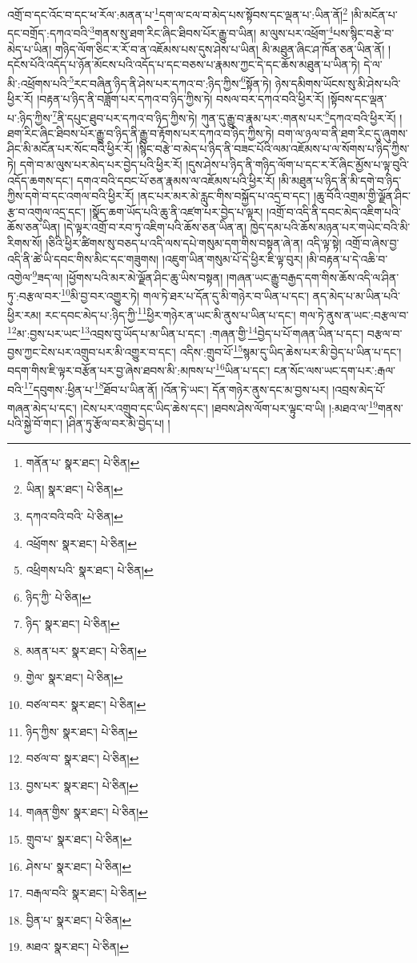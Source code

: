 འགྲོ་བ་དང་འོང་བ་དང་ཕ་རོལ་:མནན་པ་\footnote{གནོན་པ་  སྣར་ཐང་།  པེ་ཅིན། }དག་ལ་ངལ་བ་མེད་པས་སྟོབས་དང་ལྡན་པ་:ཡིན་ནོ།\footnote{ཡིན།  སྣར་ཐང་།  པེ་ཅིན། } །མི་མངོན་པ་དང་བགྲོད་:དཀའ་བའི་\footnote{དཀའ་བའི་བའི་  པེ་ཅིན། }གནས་སུ་ཐག་རིང་ཞིང་ཐིབས་པོར་རྒྱུ་བ་ཡིན། མ་ལུས་པར་འཕྲོག་\footnote{འཕྲོགས་  སྣར་ཐང་།  པེ་ཅིན། }པས་སྙིང་བརྩེ་བ་མེད་པ་ཡིན། གཉིད་ལོག་ཅིང་ར་རོ་བ་ན་འཇོམས་པས་དུས་ཤེས་པ་ཡིན། མི་མཐུན་ཞིང་ཤ་ཁོན་ཅན་ཡིན་ནོ། །དངོས་པོའི་འདོད་པ་ཉོན་མོངས་པའི་འདོད་པ་དང་བཅས་པ་རྣམས་ཀྱང་དེ་དང་ཆོས་མཐུན་པ་ཡིན་ཏེ། དེ་ལ་མི་:འཕྲོགས་པའི་\footnote{འཕྲིགས་པའི་  སྣར་ཐང་།  པེ་ཅིན། }རང་བཞིན་ཉིད་ནི་ཤེས་པར་དཀའ་བ་:ཉིད་ཀྱིས་\footnote{ཉིད་ཀྱི་  པེ་ཅིན། }སྟོན་ཏེ། ཉེས་དམིགས་ཡོངས་སུ་མི་ཤེས་པའི་ཕྱིར་རོ། །བརྟན་པ་ཉིད་ནི་བཟློག་པར་དཀའ་བ་ཉིད་ཀྱིས་ཏེ། བསལ་བར་དཀའ་བའི་ཕྱིར་རོ། །སྟོབས་དང་ལྡན་པ་:ཉིད་ཀྱིས་\footnote{ཉིད་  སྣར་ཐང་།  པེ་ཅིན། }ནི་དཔུང་ཐུབ་པར་དཀའ་བ་ཉིད་ཀྱིས་ཏེ། ཀུན་དུ་རྒྱུ་བ་རྣམ་པར་:གནས་པར་\footnote{མནན་པར་  སྣར་ཐང་།  པེ་ཅིན། }དཀའ་བའི་ཕྱིར་རོ། །ཐག་རིང་ཞིང་ཐིབས་པོར་རྒྱུ་བ་ཉིད་ནི་རྒྱུ་བ་རྟོགས་པར་དཀའ་བ་ཉིད་ཀྱིས་ཏེ། བག་ལ་ཉལ་བ་ནི་ཐག་རིང་དུ་ཞུགས་ཤིང་མི་མངོན་པར་སོང་བའི་ཕྱིར་རོ། །སྙིང་བརྩེ་བ་མེད་པ་ཉིད་ནི་བཟང་པོའི་ལམ་འཇོམས་པ་ལ་སོགས་པ་ཉིད་ཀྱིས་ཏེ། དགེ་བ་མ་ལུས་པར་མེད་པར་བྱེད་པའི་ཕྱིར་རོ། །དུས་ཤེས་པ་ཉིད་ནི་གཉིད་ལོག་པ་དང་ར་རོ་ཞིང་མྱོས་པ་ལྟ་བུའི་འདོད་ཆགས་དང་། དགའ་བའི་དབང་པོ་ཅན་རྣམས་ལ་འཇོམས་པའི་ཕྱིར་རོ། །མི་མཐུན་པ་ཉིད་ནི་མི་དགེ་བ་ཉིད་ཀྱིས་དགེ་བ་དང་འགལ་བའི་ཕྱིར་རོ། །ནང་པར་མར་མེ་རླུང་གིས་བསྐྱོད་པ་འདྲ་བ་དང་། །ཆུ་བོའི་འགྲམ་གྱི་ལྗོན་ཤིང་རྩ་བ་འགུལ་འདྲ་དང་། །སྣོད་ཆག་ཡོད་པའི་ཆུ་ནི་འཛག་པར་བྱེད་པ་ལྟར། །འགྲོ་བ་འདི་ནི་དབང་མེད་འཇིག་པའི་ཆོས་ཅན་ཡིན། །དེ་ལྟར་འགྲོ་བ་རབ་ཏུ་འཇིག་པའི་ཆོས་ཅན་ཡིན་ན། ཁྱེད་དམ་པའི་ཆོས་མཉན་པར་གཡེང་བའི་མི་རིགས་སོ། །ཅིའི་ཕྱིར་ཚིགས་སུ་བཅད་པ་འདི་ལས་དཔེ་གསུམ་དག་གིས་བསྟན་ཞེ་ན། འདི་ལྟ་སྟེ། འགྲོ་བ་ཞེས་བྱ་འདི་ནི་ཚེ་ཡི་དབང་གིས་མིང་དང་གཟུགས། །འཇུག་ཡིན་གསུམ་པོ་དེ་ཕྱིར་ཇི་ལྟ་བུར། །མི་བརྟན་པ་དེ་འཆི་བ་འགྱེལ་\footnote{གྱེལ་  སྣར་ཐང་།  པེ་ཅིན། }ཟད་ལ། །ཕྱོགས་པའི་མར་མེ་ལྗོན་ཤིང་ཆུ་ཡིས་བསྟན། །གཞན་ཡང་རྒྱུ་བརྒྱད་དག་གིས་ཆོས་འདི་ལ་ཤིན་ཏུ་:བརྩལ་བར་\footnote{བཙལ་བར་  སྣར་ཐང་།  པེ་ཅིན། }མི་བྱ་བར་འགྱུར་ཏེ། གལ་ཏེ་ཐར་པ་དོན་དུ་མི་གཉེར་བ་ཡིན་པ་དང་། ནད་མེད་པ་མ་ཡིན་པའི་ཕྱིར་རམ། རང་དབང་མེད་པ་:ཉིད་ཀྱི་\footnote{ཉིད་ཀྱིས་  སྣར་ཐང་།  པེ་ཅིན། }ཕྱིར་གཉེར་ན་ཡང་མི་ནུས་པ་ཡིན་པ་དང་། གལ་ཏེ་ནུས་ན་ཡང་:བརྩལ་བ་\footnote{བཙལ་བ་  སྣར་ཐང་།  པེ་ཅིན། }མ་:བྱས་པར་ཡང་\footnote{བྱས་པར་  སྣར་ཐང་།  པེ་ཅིན། }འབྲས་བུ་ཡོད་པ་མ་ཡིན་པ་དང་། :གཞན་གྱི་\footnote{གཞན་གྱིས་  སྣར་ཐང་།  པེ་ཅིན། }བྱེད་པ་པོ་གཞན་ཡིན་པ་དང་། བརྩལ་བ་བྱས་ཀྱང་ངེས་པར་འགྲུབ་པར་མི་འགྱུར་བ་དང་། འདིས་:གྲུབ་པོ་\footnote{གྲུབ་པ་  སྣར་ཐང་།  པེ་ཅིན། }སྙམ་དུ་ཡིད་ཆེས་པར་མི་བྱེད་པ་ཡིན་པ་དང་། བདག་གིས་ཇི་ལྟར་བརྩོན་པར་བྱ་ཞེས་ཐབས་མི་:མཁས་པ་\footnote{ཤེས་པ་  སྣར་ཐང་།  པེ་ཅིན། }ཡིན་པ་དང་། ངན་སོང་ལས་ཡང་དག་པར་:རྒལ་བའི་\footnote{བརྒལ་བའི་  སྣར་ཐང་།  པེ་ཅིན། }དབུགས་:ཕྱིན་པ་\footnote{བྱིན་པ་  སྣར་ཐང་།  པེ་ཅིན། }ཐོབ་པ་ཡིན་ནོ། །འོན་ཏེ་ཡང་། དོན་གཉེར་ནུས་དང་མ་བྱས་པར། །འབྲས་མེད་པོ་གཞན་མེད་པ་དང་། །ངེས་པར་འགྲུབ་དང་ཡིད་ཆེས་དང་། །ཐབས་ཤེས་ལོག་པར་ལྟུང་བ་ཡི། །:མཐའ་ལ་\footnote{མཐའ་  སྣར་ཐང་།  པེ་ཅིན། }གནས་པའི་སྐྱེ་བོ་གང་། །ཤིན་ཏུ་རྩོལ་བར་མི་བྱེད་པ། །
